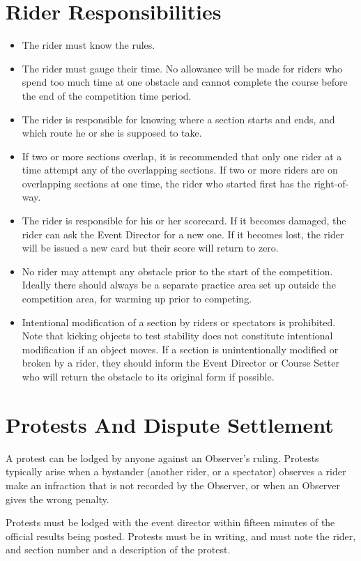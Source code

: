 \section{Rider Responsibilities \label{sec:trials_riders-responsibilities}}
\begin{itemize}
\item The rider must know the rules.
\item The rider must gauge their time. 
No allowance will be made for riders who spend too much time at one obstacle and cannot complete the course before the end of the competition time period.
\item The rider is responsible for knowing where a section starts and ends, and which route he or she is supposed to take.
\item If two or more sections overlap, it is recommended that only one rider at a time attempt any of the overlapping sections. 
If two or more riders are on overlapping sections at one time, the rider who started first has the right-of-way.
\item The rider is responsible for his or her scorecard. 
If it becomes damaged, the rider can ask the Event Director for a new one. 
If it becomes lost, the rider will be issued a new card but their score will return to zero.
\item No rider may attempt any obstacle prior to the start of the competition. 
Ideally there should always be a separate practice area set up outside the competition area, for warming up prior to competing.
\item Intentional modification of a section by riders or spectators is prohibited. 
Note that kicking objects to test stability does not constitute intentional modification if an object moves. 
If a section is unintentionally modified or broken by a rider, they should inform the Event Director or Course Setter who will return the obstacle to its original form if possible.
\end{itemize}

\section{Protests And Dispute Settlement}
A protest can be lodged by anyone against an Observer's ruling. 
Protests typically arise when a bystander (another rider, or a spectator) observes a rider make an infraction that is not recorded by the Observer, or when an Observer gives the wrong penalty.

Protests must be lodged with the event director within fifteen minutes of the official results being posted. 
Protests must be in writing, and must note the rider, and section number and a description of the protest.

